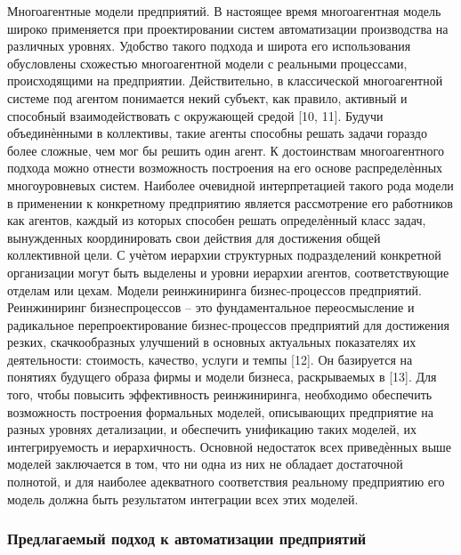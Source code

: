 Многоагентные модели предприятий. В настоящее время многоагентная модель широко применяется при проектировании систем автоматизации производства на различных
уровнях. Удобство такого подхода и широта его использования обусловлены схожестью
многоагентной модели с реальными процессами, происходящими на предприятии. Действительно, в классической многоагентной системе под агентом понимается некий субъект, как
правило, активный и способный взаимодействовать с окружающей средой [10, 11]. Будучи
объединѐнными в коллективы, такие агенты способны решать задачи гораздо более сложные,
чем мог бы решить один агент. К достоинствам многоагентного подхода можно отнести возможность построения на его основе распределѐнных многоуровневых систем.
Наиболее очевидной интерпретацией такого рода модели в применении к конкретному
предприятию является рассмотрение его работников как агентов, каждый из которых способен решать определѐнный класс задач, вынужденных координировать свои действия для достижения общей коллективной цели. С учѐтом иерархии структурных подразделений конкретной организации могут быть выделены и уровни иерархии агентов, соответствующие
отделам или цехам.
Модели реинжиниринга бизнес-процессов предприятий. Реинжиниринг бизнеспроцессов – это фундаментальное переосмысление и радикальное перепроектирование бизнес-процессов предприятий для достижения резких, скачкообразных улучшений в основных
актуальных показателях их деятельности: стоимость, качество, услуги и темпы [12]. Он базируется на понятиях будущего образа фирмы и модели бизнеса, раскрываемых в [13]. Для
того, чтобы повысить эффективность реинжиниринга, необходимо обеспечить возможность
построения формальных моделей, описывающих предприятие на разных уровнях детализации, и обеспечить унификацию таких моделей, их интегрируемость и иерархичность.
Основной недостаток всех приведѐнных выше моделей заключается в том, что ни одна из
них не обладает достаточной полнотой, и для наиболее адекватного соответствия реальному
предприятию его модель должна быть результатом интеграции всех этих моделей.

\subsubsection{Предлагаемый подход к автоматизации предприятий}

